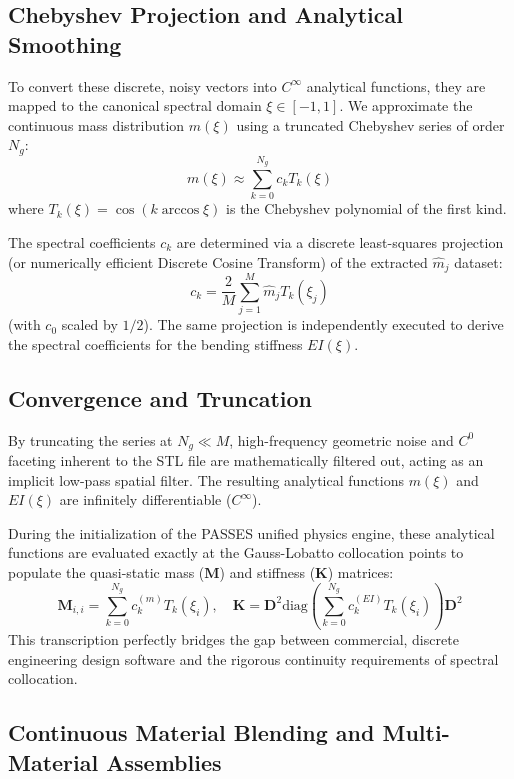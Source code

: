 \documentclass[11pt,a4paper]{article}
\theoremstyle{definition}
\numberwithin{equation}{section}
\begin{document}
\begin{appendices}
\subsection{Chebyshev Projection and Analytical Smoothing}
To convert these discrete, noisy vectors into $C^\infty$ analytical functions, they are mapped to the canonical spectral domain $\xi \in [-1, 1]$. We approximate the continuous mass distribution $m(\xi)$ using a truncated Chebyshev series of order $N_g$:
\begin{equation}
    m(\xi) \approx \sum_{k=0}^{N_g} c_k T_k(\xi)
\end{equation}
where $T_k(\xi) = \cos(k \arccos \xi)$ is the Chebyshev polynomial of the first kind. 

The spectral coefficients $c_k$ are determined via a discrete least-squares projection (or numerically efficient Discrete Cosine Transform) of the extracted $\hat{m}_j$ dataset:
\begin{equation}
    c_k = \frac{2}{M} \sum_{j=1}^{M} \hat{m}_j T_k(\xi_j)
\end{equation}
(with $c_0$ scaled by $1/2$). The same projection is independently executed to derive the spectral coefficients for the bending stiffness $EI(\xi)$.

\subsection{Convergence and Truncation}
By truncating the series at $N_g \ll M$, high-frequency geometric noise and $C^0$ faceting inherent to the STL file are mathematically filtered out, acting as an implicit low-pass spatial filter. The resulting analytical functions $m(\xi)$ and $EI(\xi)$ are infinitely differentiable ($C^\infty$). 

During the initialization of the PASSES unified physics engine, these analytical functions are evaluated exactly at the Gauss-Lobatto collocation points to populate the quasi-static mass ($\mathbf{M}$) and stiffness ($\mathbf{K}$) matrices:
\begin{equation}
    \mathbf{M}_{i,i} = \sum_{k=0}^{N_g} c_k^{(m)} T_k(\xi_i), \quad \mathbf{K} = \mathbf{D}^2 \text{diag}\left( \sum_{k=0}^{N_g} c_k^{(EI)} T_k(\xi_i) \right) \mathbf{D}^2
\end{equation}
This transcription perfectly bridges the gap between commercial, discrete engineering design software and the rigorous continuity requirements of spectral collocation.

\subsection{Continuous Material Blending and Multi-Material Assemblies}


\end{appendices}
\end{document}
